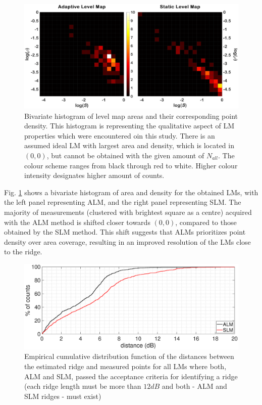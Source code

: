 \documentclass[journal,twoside,web]{ieeecolor2}
\begin{document}
\begin{figure}
\centering
\includegraphics[width=.8\textwidth]{Fig_8_Coverage_sameClim.eps} %
\caption{Bivariate histogram of level map areas and their corresponding point density.
This histogram is representing the qualitative aspect of LM properties which were encountered oin this study.
There is an assumed ideal LM with largest area and density, which is located in $(0, 0)$, but cannot be obtained with the given amount of $N_{all}$.
The colour scheme ranges from black through red to white.
Higher colour intensity designates higher amount of counts.}
\label{fig_TGT}
\end{figure}

Fig. \ref{fig_TGT} shows a bivariate histogram of area and density for the obtained LMs, with the left panel representing ALM, and the right panel representing SLM.
The majority of measurements (clustered with brightest square as a centre) acquired with the ALM method is shifted closer towards $(0, 0)$, compared to those obtained by the SLM method.
This shift suggests that ALMs prioritizes point density over area coverage, resulting in an improved resolution of the LMs close to the ridge.


\begin{figure}[ht]
\centerline{\includegraphics[width=\columnwidth]{Fig_9_Cumula.eps}}
\caption{Empirical cumulative distribution function of the distances between the estimated ridge and measured points for all LMs where both, ALM and SLM, passed the acceptance criteria for identifying a ridge (each ridge length must be more than $12dB$ and both - ALM and SLM ridges - must exist)}
\label{fig_CDF}
\end{figure}
\end{document}

